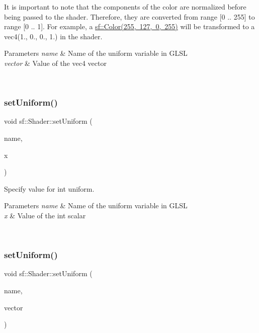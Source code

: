 It is important to note that the components of the color are normalized before being passed to the shader. Therefore, they are converted from range \mbox{[}0 .. 255\mbox{]} to range \mbox{[}0 .. 1\mbox{]}. For example, a \mbox{\hyperlink{classsf_1_1_color}{sf\+::\+Color(255, 127, 0, 255)}} will be transformed to a vec4(1., 0., 0., 1.) in the shader.


\begin{DoxyParams}{Parameters}
{\em name} & Name of the uniform variable in G\+L\+SL \\
\hline
{\em vector} & Value of the vec4 vector \begin{DoxyVerb}\end{DoxyVerb}
 \\
\hline
\end{DoxyParams}
\mbox{\label{classsf_1_1_shader_ae4fc8b4c18e6b653952bce5c8c81e4a0}} 
\subsubsection{\texorpdfstring{setUniform()}{setUniform()}\hspace{0.1cm}{\footnotesize\ttfamily [5/16]}}
{\footnotesize\ttfamily void sf\+::\+Shader\+::set\+Uniform (\begin{DoxyParamCaption}\item[{const std\+::string \&}]{name,  }\item[{int}]{x }\end{DoxyParamCaption})}



Specify value for {\ttfamily int} uniform. 


\begin{DoxyParams}{Parameters}
{\em name} & Name of the uniform variable in G\+L\+SL \\
\hline
{\em x} & Value of the int scalar \begin{DoxyVerb}\end{DoxyVerb}
 \\
\hline
\end{DoxyParams}
\mbox{\label{classsf_1_1_shader_a2ccb5bae59cedc7d6a9b533c97f7d1ed}} 
\subsubsection{\texorpdfstring{setUniform()}{setUniform()}\hspace{0.1cm}{\footnotesize\ttfamily [6/16]}}
{\footnotesize\ttfamily void sf\+::\+Shader\+::set\+Uniform (\begin{DoxyParamCaption}\item[{const std\+::string \&}]{name,  }\item[{const \mbox{\hyperlink{namespacesf_1_1_glsl_aab803ee70c4b7bfcd63ec09e10408fd3}{Glsl\+::\+Ivec2}} \&}]{vector }\end{DoxyParamCaption})}



